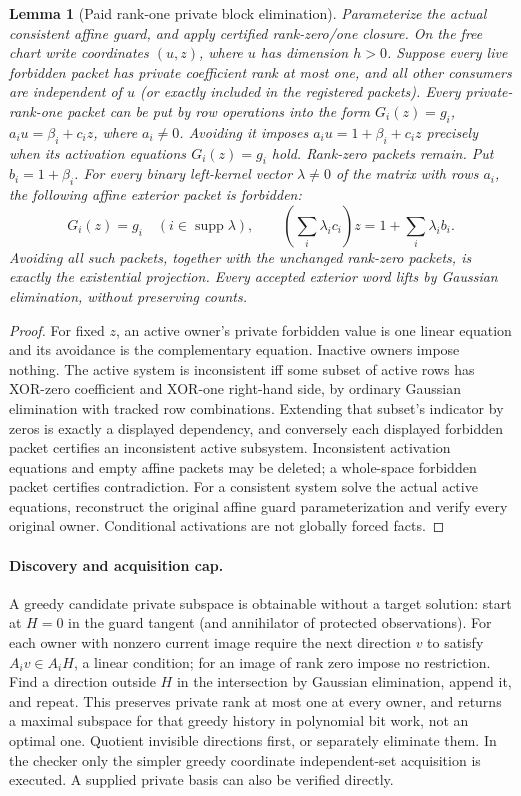 \documentclass[11pt]{article}
\newtheorem{lemma}[theorem]{Lemma}
\begin{document}
\begin{lemma}[Paid rank-one private block elimination]\label{lem:s26-dual}
Parameterize the actual consistent affine guard, and apply certified rank-zero/one closure. On the free chart write coordinates $(u,z)$, where $u$ has dimension $h>0$. Suppose every live forbidden packet has private coefficient rank at most one, and all other consumers are independent of $u$ (or exactly included in the registered packets). Every private-rank-one packet can be put by row operations into the form $G_i(z)=g_i$, $a_i u=\beta_i+c_i z$, where $a_i\ne0$. Avoiding it imposes $a_i u=1+\beta_i+c_i z$ precisely when its activation equations $G_i(z)=g_i$ hold. Rank-zero packets remain. Put $b_i=1+\beta_i$. For every binary left-kernel vector $\lambda\ne0$ of the matrix with rows $a_i$, the following affine exterior packet is forbidden:
\[
  G_i(z)=g_i\quad(i\in\operatorname{supp}\lambda),\qquad
  \left(\sum_i\lambda_i c_i\right)z=1+\sum_i\lambda_i b_i .
\]
Avoiding all such packets, together with the unchanged rank-zero packets, is exactly the existential projection. Every accepted exterior word lifts by Gaussian elimination, without preserving counts.
\end{lemma}
\begin{proof}
For fixed $z$, an active owner's private forbidden value is one linear equation and its avoidance is the complementary equation. Inactive owners impose nothing. The active system is inconsistent iff some subset of active rows has XOR-zero coefficient and XOR-one right-hand side, by ordinary Gaussian elimination with tracked row combinations. Extending that subset's indicator by zeros is exactly a displayed dependency, and conversely each displayed forbidden packet certifies an inconsistent active subsystem. Inconsistent activation equations and empty affine packets may be deleted; a whole-space forbidden packet certifies contradiction. For a consistent system solve the actual active equations, reconstruct the original affine guard parameterization and verify every original owner. Conditional activations are not globally forced facts.
\end{proof}

\paragraph{Discovery and acquisition cap.}
A greedy candidate private subspace is obtainable without a target solution: start at $H=0$ in the guard tangent (and annihilator of protected observations). For each owner with nonzero current image require the next direction $v$ to satisfy $A_i v\in A_iH$, a linear condition; for an image of rank zero impose no restriction. Find a direction outside $H$ in the intersection by Gaussian elimination, append it, and repeat. This preserves private rank at most one at every owner, and returns a maximal subspace for that greedy history in polynomial bit work, not an optimal one. Quotient invisible directions first, or separately eliminate them. In the checker only the simpler greedy coordinate independent-set acquisition is executed. A supplied private basis can also be verified directly.
\end{document}
